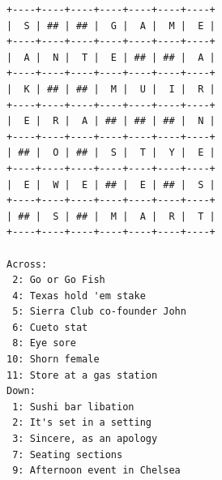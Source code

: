 \begin{lstlisting}[basicstyle = \ttfamily\scriptsize]
+----+----+----+----+----+----+----+
|  S | ## | ## |  G |  A |  M |  E |
+----+----+----+----+----+----+----+
|  A |  N |  T |  E | ## | ## |  A |
+----+----+----+----+----+----+----+
|  K | ## | ## |  M |  U |  I |  R |
+----+----+----+----+----+----+----+
|  E |  R |  A | ## | ## | ## |  N |
+----+----+----+----+----+----+----+
| ## |  O | ## |  S |  T |  Y |  E |
+----+----+----+----+----+----+----+
|  E |  W |  E | ## |  E | ## |  S |
+----+----+----+----+----+----+----+
| ## |  S | ## |  M |  A |  R |  T |
+----+----+----+----+----+----+----+

Across:
 2: Go or Go Fish
 4: Texas hold 'em stake
 5: Sierra Club co-founder John
 6: Cueto stat
 8: Eye sore
10: Shorn female
11: Store at a gas station
Down:
 1: Sushi bar libation
 2: It's set in a setting
 3: Sincere, as an apology
 7: Seating sections
 9: Afternoon event in Chelsea
\end{lstlisting}
